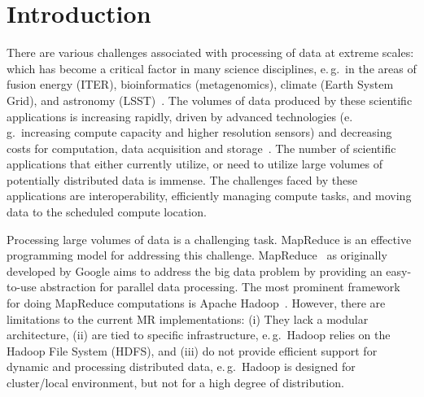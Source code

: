 \documentclass{acm_proc_article-sp}
\begin{document}



\section{Introduction}


There are various challenges associated with processing of data at
extreme scales: which has become a critical factor in many science
disciplines, e.\,g.\ in the areas of fusion energy (ITER),
bioinformatics (metagenomics), climate (Earth System Grid), and
astronomy
(LSST)~\cite{Berriman:2011:AAS:2039359.2047483,Jha:2011fk}. The
volumes of data produced by these scientific applications is
increasing rapidly, driven by advanced technologies (e.\,g.\
increasing compute capacity and higher resolution sensors) and
decreasing costs for computation, data acquisition and
storage~\cite{hey2009}. The number of scientific applications that
either currently utilize, or need to utilize large volumes of
potentially distributed data is immense. The challenges faced by these
applications are interoperability, efficiently managing compute tasks,
and moving data to the scheduled compute location.


Processing large volumes of data is a challenging task. MapReduce is
an effective programming model for addressing this challenge.
MapReduce~\cite{Dean:2004:MSD:1251254.1251264} as originally developed
by Google aims to address the big data problem by providing an
easy-to-use abstraction for parallel data processing. The most
prominent framework for doing MapReduce computations is Apache
Hadoop~\cite{hadoop}. However, there are limitations to the current MR
implementations: (i) They lack a modular architecture, (ii) are
tied to specific infrastructure, e.\,g.\ Hadoop relies on the Hadoop
File System (HDFS), and (iii) do not provide efficient support for
dynamic and processing distributed data, e.\,g.\ Hadoop is designed
for cluster/local environment, but not for a high degree of
distribution.
\end{document}

